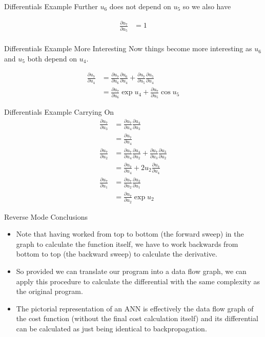 \documentclass{beamer}
\begin{document}
\begin{frame}[fragile]{Differentials Example}
Further $u_6$ does not depend on $u_5$ so we also have

$$
\begin{aligned}
\frac{\partial u_7}{\partial u_5} &= 1 \\
\end{aligned}
$$
\end{frame}

\begin{frame}[fragile]{Differentials Example More Interesting}
Now things become more interesting as $u_6$ and $u_5$ both depend on
$u_4$.

$$
\begin{aligned}
\frac{\partial u_7}{\partial u_4} &=
 \frac{\partial u_7}{\partial u_6}\frac{\partial u_6}{\partial u_4} +
 \frac{\partial u_7}{\partial u_5}\frac{\partial u_5}{\partial u_4} \\
&= \frac{\partial u_7}{\partial u_6}\exp{u_4} +
   \frac{\partial u_7}{\partial u_5}\cos{u_5}
\end{aligned}
$$
\end{frame}

\begin{frame}[fragile]{Differentials Example Carrying On}
$$
\begin{aligned}
\frac{\partial u_7}{\partial u_3} &=
 \frac{\partial u_7}{\partial u_4}\frac{\partial u_4}{\partial u_3} \\
&= \frac{\partial u_7}{\partial u_4} \\
\frac{\partial u_7}{\partial u_2} &=
 \frac{\partial u_7}{\partial u_4}\frac{\partial u_4}{\partial u_2} +
 \frac{\partial u_7}{\partial u_3}\frac{\partial u_3}{\partial u_2} \\
&= \frac{\partial u_7}{\partial u_4} + 2u_2\frac{\partial u_7}{\partial u_4} \\
\frac{\partial u_7}{\partial u_1} &=
 \frac{\partial u_7}{\partial u_2}\frac{\partial u_2}{\partial u_1} \\
&=\frac{\partial u_7}{\partial u_2}\exp{u_2}
\end{aligned}
$$
\end{frame}

\begin{frame}[fragile]{Reverse Mode Conclusions}
\begin{itemize}
\item
Note that having worked from top to bottom (the forward sweep) in the
graph to calculate the function itself, we have to work backwards from
bottom to top (the backward sweep) to calculate the derivative.
\item
So provided we can translate our program into a data flow graph, we can
apply this procedure to calculate the differential with the same
complexity as the original program.
\item
The pictorial representation of an ANN is effectively the data flow
graph of the cost function (without the final cost calculation itself)
and its differential can be calculated as just being identical to
backpropagation.
\end{itemize}
\end{frame}
\end{document}
